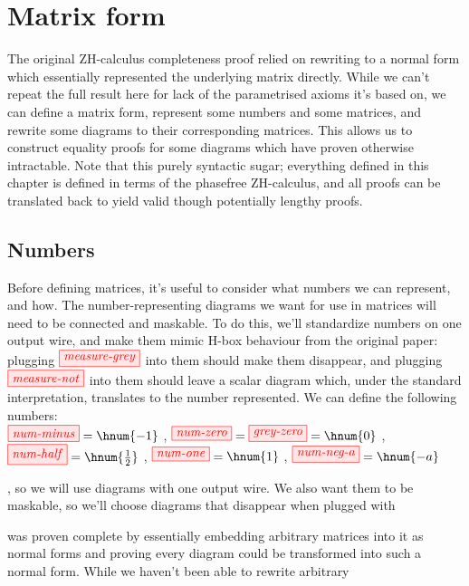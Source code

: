 \chapter{Matrix form}\label{chap:matrices}
The original ZH-calculus completeness proof relied on rewriting to a normal form
which essentially represented the underlying matrix directly. While we can't
repeat the full result here for lack of the parametrised axioms it's based on,
we can define a matrix form, represent some numbers and some matrices, and
rewrite some diagrams to their corresponding matrices. This allows us to
construct equality proofs for some diagrams which have proven otherwise
intractable. Note that this purely syntactic sugar; everything defined in this
chapter is defined in terms of the phasefree ZH-calculus, and all proofs can be
translated back to yield valid though potentially lengthy proofs.

\section{Numbers}
Before defining matrices, it's useful to consider what numbers we can
represent, and how. The number-representing diagrams we want for use in matrices
will need to be connected and maskable. To do this, we'll standardize numbers on
one output wire, and make them mimic H-box behaviour from the original paper:
plugging $\tikzfig{measure-grey}$ into them should make them disappear, and
plugging $\tikzfig{measure-not}$ into them should leave a scalar diagram which,
under the standard interpretation, translates to the number represented. We can
define the following numbers: \\
${\tikzfig{num-minus} = \hnum{-1}}$ , 
${\tikzfig{num-zero} = \tikzfig{grey-zero} = \hnum{0}}$ ,
${\tikzfig{num-half} = \hnum{\frac{1}{2}}}$ ,
${\tikzfig{num-one} = \hnum{1}}$ ,
${\tikzfig{num-neg-a} = \hnum{-a}}$

, so we will use diagrams with one output wire. We also
want them to be maskable, so we'll choose diagrams that disappear when plugged
with 


was proven complete by essentially embedding
arbitrary matrices into it as normal forms and proving every diagram could be
transformed into such a normal form. While we haven't been able to rewrite
arbitrary 



